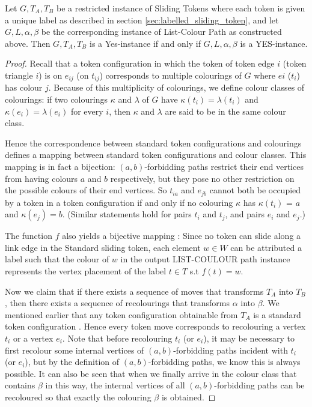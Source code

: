 \begin{claim} Let $G, T_A, T_B$ be a restricted instance of Sliding Tokens where each token is given a unique label as described in
section \ref{sec:labelled_sliding_token}, and let $G , L, \alpha, \beta$ be the corresponding instance of List-Colour Path as constructed above.
Then $G, T_A, T_B$ is a Yes-instance if and only if $G , L, \alpha, \beta$ is a YES-instance.
\end{claim}\label{theorem:labelled_sliding}

\begin{proof} \cite{bonsma}
Recall that a token configuration in which the token of token edge $i$ (token triangle $i$) is on $e_{ij}$ (on $t_ {ij}$) corresponds
to multiple colourings of $G$ where $ei$ ($t_i$) has colour $j$. Because of this multiplicity of colourings, we define colour classes of
colourings: if two colourings $\kappa$ and $\lambda$ of $G$ have $\kappa(t_i) = \lambda(t_i)$ and $\kappa(e_i) = \lambda(e_i)$ for every $i$,
then $\kappa$ and $\lambda$ are said to be in the same colour class.

Hence the correspondence between standard token configurations and colourings defines a mapping between standard
token configurations and colour classes. This mapping is in fact a bijection: $(a, b)$-forbidding paths restrict their end vertices
from having colours $a$ and $b$ respectively, but they pose no other restriction on the possible colours of their end vertices.
So $t_{ia}$ and $e_{jb}$ cannot both be occupied by a token in a token configuration if and only if no colouring $\kappa$ has $\kappa(t_i)$ = $a$
and $\kappa(e_j) = b$. (Similar statements hold for pairs $t_i$ and $t_j$, and pairs $e_i$ and $e_j$.)

The function $f$ also yields a bijective mapping : Since no token can slide along a link edge in the Standard sliding token,
each element $w \in W$ can be attributed a label such that the colour of $w$ in the output LIST-COULOUR path instance represents
the vertex placement of the label $t \in T$ s.t $f(t) = w$.

Now we claim that if there exists a sequence of moves that transforms $T_A$ into $T_B$, then there exists a sequence of
recolourings that transforms $\alpha$ into $\beta$. We mentioned earlier that any token configuration obtainable from $T_A$ is a standard
token configuration \cite{bonsma}. Hence every token move corresponds to recolouring a vertex $t_i$ or a vertex $e_i$. Note that before
recolouring $t_i$ (or $e_i$), it may be necessary to first recolour some internal vertices of $(a, b)$-forbidding paths incident with
$t_i$ (or $e_i$), but by the definition of $(a, b)$-forbidding paths, we know this is always possible. It can also be seen that when
we finally arrive in the colour class that contains $\beta$ in this way, the internal vertices of all $(a, b)$-forbidding paths can be
recoloured so that exactly the colouring $\beta$ is obtained.


\end{proof}
